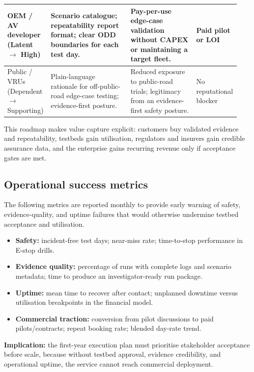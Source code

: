 \documentclass[11pt, a4paper]{report}
\numberwithin{equation}{section}
\begin{document}
\begin{refsection}
\begin{table}[htbp]
\begin{tabular}{|>{\raggedright\arraybackslash}p{0.17\linewidth}|>{\raggedright\arraybackslash}p{0.34\linewidth}|>{\raggedright\arraybackslash}p{0.28\linewidth}|>{\raggedright\arraybackslash}p{0.15\linewidth}|}
\hline
OEM / AV developer (Latent $\rightarrow$ High) & Scenario catalogue; repeatability report format; clear ODD boundaries for each test day. & Pay-per-use edge-case validation without CAPEX or maintaining a target fleet. & Paid pilot or LOI \\
\hline
Public / VRUs (Dependent $\rightarrow$ Supporting) & Plain-language rationale for off-public-road edge-case testing; evidence-first posture. & Reduced exposure to public-road trials; legitimacy from an evidence-first safety posture. & No reputational blocker \\
\hline
\end{tabular}
\end{table}

This roadmap makes value capture explicit: customers buy validated evidence and repeatability, testbeds gain utilisation, regulators and insurers gain credible assurance data, and the enterprise gains recurring revenue only if acceptance gates are met.

\subsection{Operational success metrics}

The following metrics are reported monthly to provide early warning of safety, evidence-quality, and uptime failures that would otherwise undermine testbed acceptance and utilisation.

\begin{itemize}
    \item \textbf{Safety:} incident-free test days; near-miss rate; time-to-stop performance in E-stop drills.
    \item \textbf{Evidence quality:} percentage of runs with complete logs and scenario metadata; time to produce an investigator-ready run package.
    \item \textbf{Uptime:} mean time to recover after contact; unplanned downtime versus utilisation breakpoints in the financial model.
    \item \textbf{Commercial traction:} conversion from pilot discussions to paid pilots/contracts; repeat booking rate; blended day-rate trend.
\end{itemize}

\noindent\textbf{Implication:} the first-year execution plan must prioritise stakeholder acceptance before scale, because without testbed approval, evidence credibility, and operational uptime, the service cannot reach commercial deployment.


\end{refsection}
\end{document}
